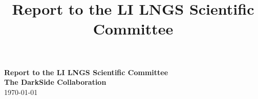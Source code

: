 \documentclass[aps,twocolumn,superscriptaddress,floatfix,nofootinbib,showpacs,amsmath,amssymb,altaffilletter,floatfix]{revtex4-1}
\begin{document}
\setlength{\parindent}{1em}
\setdefaultleftmargin{1em}{1em}{}{}{}{}
\setcounter{page}{0}\thispagestyle{empty}
\onecolumngrid
\begin{center}
{\bf \LARGE Report to the LI LNGS Scientific Committee}\\
\vspace{.5in}
{\bf \Large The DarkSide Collaboration}\\
\today

\vspace{.5in}
\end{center}
\vspace{.2in}

\clearpage
\newpage
{}
\title{Report to the LI LNGS Scientific Committee}

\maketitle
\clearpage
\onecolumngrid
\setcounter{tocdepth}{2}
\tableofcontents
\makeatletter
\let\toc@pre\relax
\let\toc@post\relax
\makeatother
\clearpage

\newpage
{}
\clearpage
\twocolumngrid


%




%


%


%
%




\end{document}
